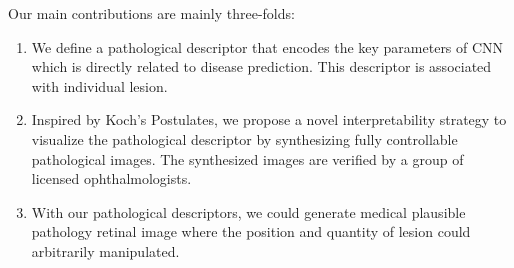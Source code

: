 \documentclass[letterpaper]{article} %
\begin{document}



	Our main contributions are mainly three-folds:
\begin{enumerate}
\item We define a pathological descriptor that encodes the key parameters of CNN which is directly related to disease prediction. This descriptor is associated with individual lesion.
\item Inspired by Koch's Postulates, we propose a novel interpretability strategy to visualize the pathological descriptor by synthesizing fully controllable pathological images. The synthesized images are  verified  by a group of licensed  ophthalmologists.
\item With our pathological descriptors, we could generate medical plausible pathology retinal image where the position and quantity of lesion could arbitrarily manipulated.
\end{enumerate}








\end{document}
